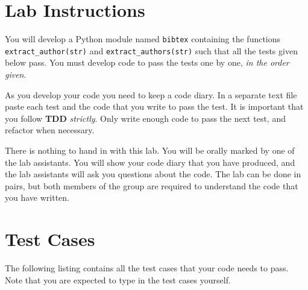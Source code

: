 \documentclass[10pt]{paper}
\begin{document}
\section*{Lab Instructions}
You will develop a Python module named \texttt{bibtex} containing the
functions \texttt{extract\_author(str)} and
\texttt{extract\_authors(str)} such that all the tests given below
pass.  You must develop code to pass the tests one by one, \emph{in
  the order given}.

As you develop your code you need to keep a code diary. In a separate
text file paste each test and the code that you write to pass the
test. It is important that you follow \textbf{TDD}
\emph{strictly}. Only write enough code to pass the next test, and
refactor when necessary.

There is nothing to hand in with this lab. You will be orally marked
by one of the lab assistants. You will show your code diary that you 
have produced,
and the lab assistants will ask you questions about the code. The lab
can be done in pairs, but both members of the group are required to
understand the code that you have written.  


\section*{Test Cases}
The following listing contains all the test cases that your code needs
to pass. Note that you are expected to type in the test cases
yourself.
\end{document}
